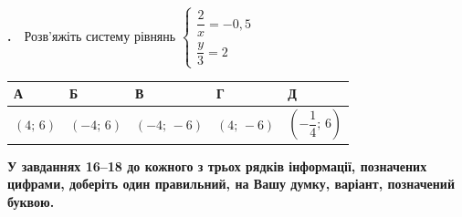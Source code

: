 \documentclass[12pt]{article}
\newlength{\nmtcellw}
\newcommand{\nmtSetCell}{\setlength{\nmtcellw}{\dimexpr(\linewidth-10\tabcolsep-6\arrayrulewidth)/5\relax}}
\newcommand{\answerTableTall}[5]{%
\par\nopagebreak\vspace{0.15cm}
\noindent\nmtSetCell
\begin{tabular}{|*{5}{>{\centering\arraybackslash}m{\nmtcellw}|}}
\hline
\rule[-0.2cm]{0pt}{0.7cm}\textbf{А} & \rule[-0.2cm]{0pt}{0.7cm}\textbf{Б} & \rule[-0.2cm]{0pt}{0.7cm}\textbf{В} & \rule[-0.2cm]{0pt}{0.7cm}\textbf{Г} & \rule[-0.2cm]{0pt}{0.7cm}\textbf{Д} \\
\hline
\rule[-0.45cm]{0pt}{1.2cm}#1 & \rule[-0.45cm]{0pt}{1.2cm}#2 & \rule[-0.45cm]{0pt}{1.2cm}#3 & \rule[-0.45cm]{0pt}{1.2cm}#4 & \rule[-0.45cm]{0pt}{1.2cm}#5 \\
\hline
\end{tabular}
\par\vspace{0.25cm}
}
\newcommand{\instructionBox}[1]{%
\par\vspace{0.3cm}
\begin{tcolorbox}[colback=instrBg, colframe=instrBorder, boxrule=0.6pt, arc=2pt,
    left=8pt, right=8pt, top=4pt, bottom=4pt]
\centering\small\bfseries #1
\end{tcolorbox}
\par\vspace{0.15cm}
}
\newcommand{\matchingGrid}{%
    \sbox{\nmtgridbox}{\matchingGridRaw}%
    \ifdim\wd\nmtgridbox>\linewidth \resizebox{\linewidth}{!}{\usebox{\nmtgridbox}}\else\usebox{\nmtgridbox}\fi}
\newcommand{\matchingGridRaw}{%
    \begingroup
    \renewcommand{\arraystretch}{1.15}
    \setlength{\tabcolsep}{4pt}
    \footnotesize
    \begin{tabular}{r|c|c|c|c|c|}
         \multicolumn{1}{c}{} & \multicolumn{1}{c}{\textbf{А}} & \multicolumn{1}{c}{\textbf{Б}} & \multicolumn{1}{c}{\textbf{В}} & \multicolumn{1}{c}{\textbf{Г}} & \multicolumn{1}{c}{\textbf{Д}} \\ \cline{2-6}
         \textbf{1} & \phantom{X} & \phantom{X} & \phantom{X} & \phantom{X} & \phantom{X} \\ \cline{2-6}
         \textbf{2} & & & & & \\ \cline{2-6}
         \textbf{3} & & & & & \\ \cline{2-6}
    \end{tabular}
    \endgroup
}
\newcounter{zad}
\newcommand{\zadtask}[1]{\stepcounter{zad}\noindent\textbf{\thezad.}\ \ #1\par\nopagebreak\vspace{0.2cm}}
\newcounter{ans}
\renewcommand{\instructionBox}[1]{%
\par\vspace{0.3cm}\noindent
\begin{tcolorbox}[nobeforeafter, width=\linewidth, colback=instrBg, colframe=instrBorder, boxrule=0.6pt, arc=2pt,
    left=8pt, right=8pt, top=4pt, bottom=4pt]
\centering\small\bfseries #1
\end{tcolorbox}
\par\nopagebreak\vspace{0.15cm}\nopagebreak
}
\begin{document}
\begin{samepage}
\zadtask{Розв'яжіть систему рівнянь $\begin{cases} \dfrac{2}{x} = -0{,}5 \\[0.2cm] \dfrac{y}{3} = 2 \end{cases}$}
\answerTableTall{$(4;\, 6)$}{$(-4;\, 6)$}{$(-4;\, -6)$}{$(4;\, -6)$}{$\left(-\dfrac{1}{4};\, 6\right)$}

\par{}
\end{samepage}
\endgroup

\instructionBox{У завданнях 16--18 до кожного з трьох рядків інформації, позначених цифрами, доберіть один правильний, на Вашу думку, варіант, позначений буквою.}

\begingroup
\providecommand{\trigStyle}[1]{#1}
\providecommand{\answerTableSmall}[5]{%
\begingroup\setlength{\tabcolsep}{2pt}\small\nmtSetCell
\begin{tabular}{|*{5}{>{\centering\arraybackslash}m{\nmtcellw}|}}
\hline
\rule[-0.2cm]{0pt}{0.6cm}\textbf{А} & \textbf{Б} & \textbf{В} & \textbf{Г} & \textbf{Д} \\
\hline
\rule[-0.4cm]{0pt}{0.9cm}#1 & \rule[-0.4cm]{0pt}{0.9cm}#2 & \rule[-0.4cm]{0pt}{0.9cm}#3 & \rule[-0.4cm]{0pt}{0.9cm}#4 & \rule[-0.4cm]{0pt}{0.9cm}#5 \\
\hline
\end{tabular}\endgroup}
\providecommand{\matchingLayout}[3]{%
    \noindent
    \begin{minipage}[t]{0.36\textwidth}\vspace{0pt}\raggedright
        #1
    \end{minipage}%
    \hfill
    \begin{minipage}[t]{0.43\textwidth}\vspace{0pt}\raggedright
        #2
    \end{minipage}%
    \hfill
    \begin{minipage}[t]{0.19\textwidth}
        \vspace{0pt}
        \begin{flushright}
        #3
        \end{flushright}
    \end{minipage}}
\providecommand{\matchingLayoutBottom}[2]{%
    \noindent
    \begin{minipage}[t]{0.48\textwidth}\vspace{0pt}\raggedright
        #1
    \end{minipage}%
    \hfill
    \begin{minipage}[t]{0.48\textwidth}\vspace{0pt}\raggedright
        #2
    \end{minipage}
    \vspace{0.5cm}
    \noindent
    \matchingGrid}
\end{document}
